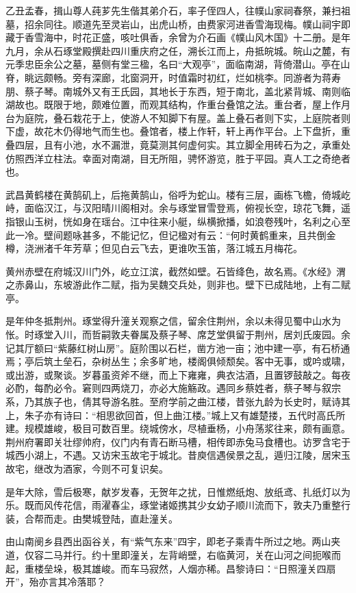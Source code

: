 \documentclass[]{article}
\begin{document}
乙丑孟春，揖山尊人莼芗先生偕其弟介石，率子侄四人，往幞山家祠春祭，兼扫祖墓，招余同往。顺道先至灵岩山，出虎山桥，由费家河进香雪海现梅。幞山祠宇即藏于香雪海中，时花正盛，咳吐俱香，余曾为介石画《幞山风木国》十二册。是年九月，余从石琢堂殿撰赴四川重庆府之任，溯长江而上，舟抵皖城。皖山之麓，有元季忠臣余公之墓，墓侧有堂三楹，名曰``大观亭''，面临南湖，背倚潜山。亭在山脊，眺远颇畅。旁有深廊，北窗洞开，时值霜时初红，烂如桃李。同游者为蒋寿朋、蔡子琴。南城外又有王氏园，其地长于东西，短于南北，盖北紧背城、南则临湖故也。既限于地，颇难位置，而观其结构，作重台叠馆之法。重台者，屋上作月台为庭院，叠石栽花于上，使游人不知脚下有屋。盖上叠石者则下实，上庭院者则下虚，故花木仍得地气而生也。叠馆者，楼上作轩，轩上再作平台。上下盘折，重叠四层，且有小池，水不漏泄，竟莫测其何虚何实。其立脚全用砖石为之，承重处仿照西洋立柱法。幸面对南湖，目无所阻，骋怀游览，胜于平园。真人工之奇绝者也。

武昌黄鹤楼在黄鹄矶上，后拖黄鹄山，俗呼为蛇山。楼有三层，画栋飞檐，倚城屹峙，面临汉江，与汉阳晴川阁相对。余与琢堂冒雪登焉，俯视长空，琼花飞舞，遥指银山玉树，恍如身在瑶台。江中往来小艇，纵横掀播，如浪卷残叶，名利之心至此一冷。壁间题咏甚多，不能记忆，但记楹对有云：``何时黄鹤重来，且共倒金樽，浇洲渚千年芳草；但见白云飞去，更谁吹玉笛，落江城五月梅花。

黄州赤壁在府城汉川门外，屹立江滨，截然如壁。石皆绛色，故名焉。《水经》渭之赤鼻山，东坡游此作二赋，指为吴魏交兵处，则非也。壁下已成陆地，上有二赋亭。

是年仲冬抵荆州。琢堂得升潼关观察之信，留余住荆州，余以未得见蜀中山水为怅。时琢堂入川，而哲嗣敦夫眷属及蔡子琴、席芝堂俱留于荆州，居刘氏废园。余记其厅额曰``紫藤红树山房''。庭阶围以石栏，凿方池一亩；池中建一亭，有石桥通焉；亭后筑土垒石，杂树丛生；余多旷地，楼阁俱倾颓矣。客中无事，或吟或啸，或出游，或聚谈。岁暮虽资斧不继，而上下雍雍，典衣沽酒，且置锣鼓敲之。每夜必酌，每酌必令。窘则四两烧刀，亦必大施觞政。遇同乡蔡姓者，蔡子琴与叙宗系，乃其族子也，倩其导游名胜。至府学前之曲江楼，昔张九龄为长史时，赋诗其上，朱子亦有诗曰：``相思欲回首，但上曲江楼。''城上又有雄楚搂，五代时高氏所建。规模雄峻，极目可数百里。绕城傍水，尽植垂杨，小舟荡浆往来，颇有画意。荆州府署即关壮缪帅府，仪门内有青石断马槽，相传即赤兔马食槽也。访罗含宅于城西小湖上，不遇。又访宋玉故宅于城北。昔庾信遇侯景之乱，遁归江陵，居宋玉故宅，继改为酒家，今则不可复识矣。

是年大除，雪后极寒，献岁发春，无贺年之扰，日惟燃纸炮、放纸鸢、扎纸灯以为乐。既而风传花信，雨濯春尘，琢堂诸姬携其少女幼子顺川流而下，敦夫乃重整行装，合帮而走。由樊城登陆，直赴潼关。

由山南阌乡县西出函谷关，有``紫气东来''四宇，即老子乘青牛所过之地。两山夹道，仅容二马并行。约十里即潼关，左背峭壁，右临黄河，关在山河之间扼喉而起，重楼垒垛，极其雄峻。而车马寂然，人烟亦稀。昌黎诗曰：``日照潼关四扇开''，殆亦言其冷落耶？
\end{document}
